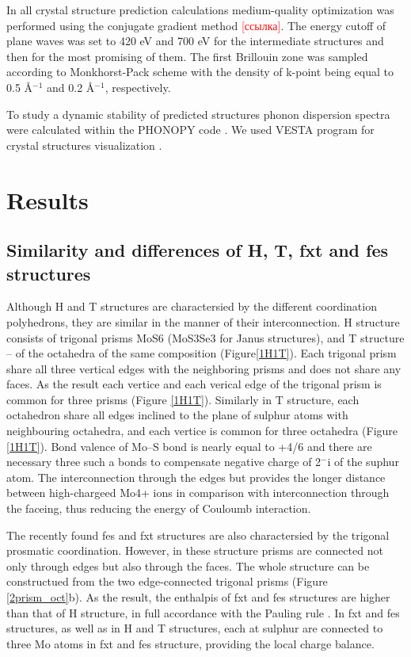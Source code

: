 \documentclass[a4paperm]{article}
\begin{document}
In all crystal structure prediction calculations medium-quality optimization was performed using the conjugate gradient method \textcolor{red}{[ссылка]}. The energy cutoff of plane waves was set to 420 eV and 700 eV for the intermediate structures and then for the most promising of them. The first Brillouin zone was sampled according to Monkhorst-Pack scheme \cite{monkhorst1976special} with the density of k-point being equal to 0.5 \AA$^{-1}$ and 0.2 \AA$^{-1}$, respectively. 


To study a dynamic stability of predicted structures phonon dispersion spectra were calculated within the PHONOPY code \cite{phonopy}. We used VESTA program for crystal structures visualization \cite{momma2011vesta}.


			\section{Results}

\subsection{Similarity and differences of H, T, fxt and fes structures}

Although H and T structures are charactersied by the different coordination polyhedrons, they are similar in the manner of their interconnection.
H structure consists of trigonal prisms MoS6 (MoS3Se3 for Janus structures), and T structure – of the octahedra of the same composition (Figure\ref{1H1T}).
Each trigonal prism share all three vertical edges with the neighboring prisms and does not share any faces.
As the result each vertice and each verical edge of the trigonal prism is common for three prisms (Figure \ref{1H1T}).
Similarly in T structure, each octahedron share all edges inclined to the plane of sulphur atoms with neighbouring octahedra, and each vertice is common for three octahedra (Figure \ref{1H1T}).
Bond valence of Mo--S bond is nearly equal to +4/6 and there are necessary three such a bonds to compensate negative charge of 2$^-$i of the suphur atom.
The interconnection through the edges but provides the longer distance between high-chargeed Mo4+ ions in comparison with interconnection through the faceing, thus reducing the energy of Couloumb interaction.

The recently found fes and fxt structures are also charactersied by the trigonal prosmatic coordination.
However, in these structure prisms are connected not only through edges but also through the faces.
The whole structure can be constructued from the two edge-connected trigonal prisms (Figure \ref{2prism_oct}b).
As the result, the enthalpis of fxt and fes structures are higher than that of H structure, in full accordance with the Pauling rule \cite{Pauling1929}.
In fxt and fes structures, as well as in H and T structures, each at sulphur are connected to three Mo atoms in fxt and fes structure, providing the local charge balance.
\end{document}
